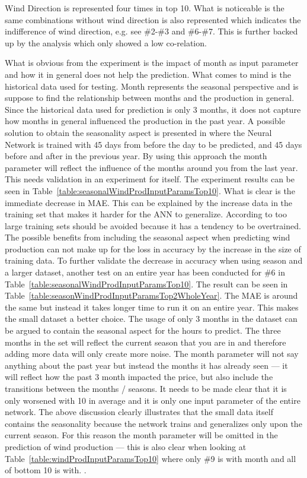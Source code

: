 Wind Direction is represented four times in top 10. What is noticeable is the same combinations without wind direction is also represented which indicates the indifference of wind direction, e.g. see \#2-\#3 and \#6-\#7. This is further backed up by the analysis which only showed a low co-relation. 

What is obvious from the experiment is the impact of month as input parameter and how it in general does not help the prediction. What comes to mind is the historical data used for testing. Month represents the seasonal perspective and is suppose to find the relationship between months and the production in general. Since the historical data used for prediction is only 3 months, it does not capture how months in general influenced the production in the past year. A possible solution to obtain the seasonality aspect is presented in\cite{pjmForecast} where the Neural Network is trained with 45 days from before the day to be predicted, and 45 days before and after in the previous year. By using this approach the month parameter will reflect the influence of the months around you from the last year. This needs validation in an experiment for itself. The experiment results can be seen in Table~\ref{table:seasonalWindProdInputParamsTop10}. What is clear is the immediate decrease in MAE. This can be explained by the increase data in the training set that makes it harder for the ANN to generalize. According to\cite{1} too large training sets should be avoided because it has a tendency to be overtrained. The possible benefits from including the seasonal aspect when predicting wind production can not make up for the loss in accuracy by the increase in the size of training data. To further validate the decrease in accuracy when using season and a larger dataset, another test on an entire year has been conducted for \#6 in Table~\ref{table:seasonalWindProdInputParamsTop10}. The result can be seen in Table~\ref{table:seasonWindProdInputParamsTop2WholeYear}. The MAE is around the same but instead it takes longer time to run it on an entire year. This makes the small dataset a better choice. The usage of only 3 months in the dataset can be argued to contain the seasonal aspect for the hours to predict. The three months in the set will reflect the current season that you are in and therefore adding more data will only create more noise. The month parameter will not say anything about the past year but instead the months it has already seen --- it will reflect how the past 3 month impacted the price, but also include the transitions between the months / seasons. It needs to be made clear that it is only worsened with 10 in average and it is only one input parameter of the entire network. The above discussion clearly illustrates that the small data itself contains the seasonality because the network trains and generalizes only upon the current season. For this reason the month parameter will be omitted in the prediction of wind production --- this is also clear when looking at Table~\ref{table:windProdInputParamsTop10} where only \#9 is with month and all of bottom 10 is with. . 

